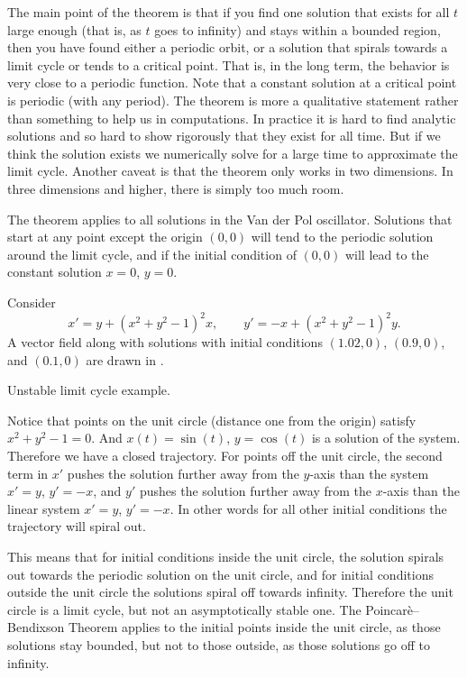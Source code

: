 The main point of the theorem is that if you find one solution that exists
for all $t$ large enough (that is, as $t$ goes to infinity) and stays
within a bounded region, then
you have found either a periodic orbit, or a solution that spirals towards a
limit cycle or tends to a critical point.
That is, in the long term, the
behavior is very close to a periodic function.
Note that a constant solution at a critical point is periodic (with
any period).
The theorem is more a qualitative statement rather than
something to help us in computations.  In practice it is hard to find
analytic solutions and so hard to show rigorously that they exist for all
time.
But if we think the solution exists we numerically solve for a
large time to approximate the limit cycle.
Another caveat is that the theorem only works in two
dimensions.  In three dimensions and higher, there is simply too much room.

The theorem applies to all solutions in the Van der Pol oscillator.
Solutions that start at any point except the origin $(0,0)$ will tend to the
periodic solution around the limit cycle, and if the initial condition
of $(0,0)$ will lead to the constant solution $x=0$, $y=0$.

\begin{example}
Consider
\begin{equation*}
x' = y + {(x^2+y^2-1)}^2 x, \qquad
y' = -x + {(x^2+y^2-1)}^2 y.
\end{equation*}
A vector field along with solutions with initial conditions
$(1.02,0)$, $(0.9,0)$, and $(0.1,0)$ are drawn in
.

\begin{myfig}
\capstart
{}
\caption{Unstable limit cycle example.\label{fig:nlin-unstable-limit-cycle}}
\end{myfig}

Notice that points on the unit circle (distance one from the origin)
satisfy $x^2+y^2-1=0$.  And $x(t) = \sin(t)$, $y = \cos(t)$ is a solution
of the system.  Therefore we have a closed trajectory.
For points off the unit circle, the second term in
$x'$ pushes the solution further
away from the $y$-axis than the system $x' = y$, $y' = -x$,
and $y'$ pushes the solution further away from the $x$-axis
than the linear system $x'=y$, $y' = -x$.  In other words for all
other initial conditions the trajectory will spiral out.

This means that for initial conditions inside the unit circle, the solution
spirals out towards the periodic solution on the unit circle, and
for initial conditions outside the unit circle the solutions spiral off
towards infinity.  Therefore the unit circle is a limit cycle, but
not an asymptotically stable one.
The Poincar\`e--Bendixson Theorem applies to the initial points inside
the unit circle, as those solutions stay bounded, but not to those outside,
as those solutions go off to infinity.
\end{example}

